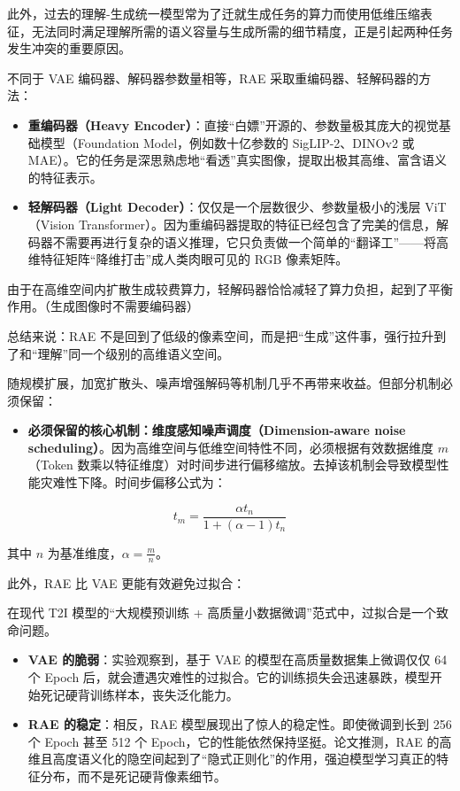 此外，过去的理解-生成统一模型常为了迁就生成任务的算力而使用低维压缩表征，无法同时满足理解所需的语义容量与生成所需的细节精度，正是引起两种任务发生冲突的重要原因。

不同于 VAE 编码器、解码器参数量相等，RAE 采取重编码器、轻解码器的方法：

\begin{itemize}
\tightlist
\item
  \textbf{重编码器（Heavy Encoder）}：直接``白嫖''开源的、参数量极其庞大的视觉基础模型（Foundation Model，例如数十亿参数的 SigLIP-2、DINOv2 或 MAE）。它的任务是深思熟虑地``看透''真实图像，提取出极其高维、富含语义的特征表示。
\item
  \textbf{轻解码器（Light Decoder）}：仅仅是一个层数很少、参数量极小的浅层 ViT（Vision Transformer）。因为重编码器提取的特征已经包含了完美的信息，解码器不需要再进行复杂的语义推理，它只负责做一个简单的``翻译工''------将高维特征矩阵``降维打击''成人类肉眼可见的 RGB 像素矩阵。
\end{itemize}

由于在高维空间内扩散生成较费算力，轻解码器恰恰减轻了算力负担，起到了平衡作用。（生成图像时不需要编码器）

总结来说：RAE 不是回到了低级的像素空间，而是把``生成''这件事，强行拉升到了和``理解''同一个级别的高维语义空间。

随规模扩展，加宽扩散头、噪声增强解码等机制几乎不再带来收益。但部分机制必须保留：

\begin{itemize}
\tightlist
\item
{}
  \textbf{必须保留的核心机制：维度感知噪声调度（Dimension-aware noise scheduling）}。因为高维空间与低维空间特性不同，必须根据有效数据维度 \(m\)（Token 数乘以特征维度）对时间步进行偏移缩放。去掉该机制会导致模型性能灾难性下降。时间步偏移公式为：
\end{itemize}

\[
t_m=\frac{\alpha t_n}{1+(\alpha-1)t_n}
\]

其中 \(n\) 为基准维度，\(\alpha=\frac{m}{n}\)。

此外，RAE 比 VAE 更能有效避免过拟合：

在现代 T2I 模型的``大规模预训练 + 高质量小数据微调''范式中，过拟合是一个致命问题。

\begin{itemize}
\tightlist
\item
  \textbf{VAE 的脆弱}：实验观察到，基于 VAE 的模型在高质量数据集上微调仅仅 64 个 Epoch 后，就会遭遇灾难性的过拟合。它的训练损失会迅速暴跌，模型开始死记硬背训练样本，丧失泛化能力。
\item
  \textbf{RAE 的稳定}：相反，RAE 模型展现出了惊人的稳定性。即使微调到长到 256 个 Epoch 甚至 512 个 Epoch，它的性能依然保持坚挺。论文推测，RAE 的高维且高度语义化的隐空间起到了``隐式正则化''的作用，强迫模型学习真正的特征分布，而不是死记硬背像素细节。
\end{itemize}

